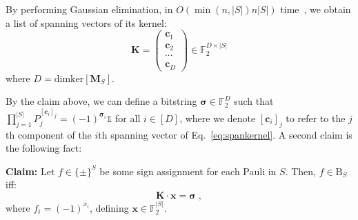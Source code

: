 \documentclass[10pt,aps,pra,twocolumn,floatfix,nofootinbib,superscriptaddress,longbibliography]{revtex4-2}
\newcommand{\1}{\mathbbm{1}}
\begin{document}
    
    By performing Gaussian elimination, in $O(\min(n, |S|) n|S|)$ time~\cite{CLRS4}, we obtain a list of spanning vectors of its kernel:
    \begin{equation}
        \mathbf K=\begin{pmatrix}
            \mathbf c_1\\
            \mathbf c_2\\
            \cdots\\
            \mathbf c_D
        \end{pmatrix} \in \mathbb F^{D \times |S|}_2
        \label{eq:spankernel}
    \end{equation}
    where $D=\mathrm{dim} \mathrm{ker}[\mathbf M_S]$. 

    By the claim above, we can define a bitstring $\boldsymbol{\sigma} \in \mathbb F_2^{D}$ such that $\prod_{j=1}^{|S|}P_j^{[\bm{c}_i]_j} = (-1)^{\boldsymbol{\sigma}_i}\mathds{1}$ for all $i \in [D]$, where we denote $[\mathbf c_i]_j$ to refer to the $j$th component of the $i$th spanning vector of Eq.~\eqref{eq:spankernel}. A second claim is the following fact:
    
    \textbf{Claim: }Let $ f \in \{\pm\}^S$ be some sign assignment for each Pauli in $S$. Then, $f \in \mathrm B_S$ iff:
    \begin{equation}
        \mathbf K \cdot \mathbf x = \boldsymbol{\sigma}\;,
    \end{equation}
    where $f_i = (-1)^{x_i}$, defining $\mathbf x \in \mathbb F_2^{|S|}$. 
    
\end{document}
